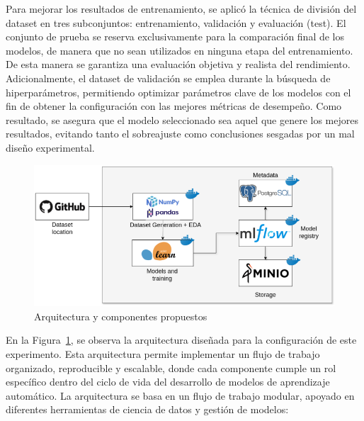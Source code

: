\documentclass[11pt,a4paper,spanish]{book}
\numberwithin{equation}{chapter}
\numberwithin{figure}{chapter}
\begin{document}
Para mejorar los resultados de entrenamiento, se aplicó la técnica de división del dataset en tres subconjuntos: entrenamiento, validación y evaluación (test). El conjunto de prueba se reserva exclusivamente para la comparación final de los modelos, de manera que no sean utilizados en ninguna etapa del entrenamiento. De esta manera se garantiza una evaluación objetiva y realista del rendimiento. 
Adicionalmente, el dataset de validación se emplea durante la búsqueda de hiperparámetros, permitiendo optimizar parámetros clave de los modelos con el fin de obtener la configuración con las mejores métricas de desempeño. Como resultado, se asegura que el modelo seleccionado sea aquel que genere los mejores resultados, evitando tanto el sobreajuste como conclusiones sesgadas por un mal diseño experimental.

\begin{figure}[h]
    \centering
    \includegraphics[width=1\textwidth]{media/arquitecura.png}
    \caption{Arquitectura y componentes propuestos  }
    \label{fig:figArchitecture}
\end{figure}

En la Figura~\ref{fig:figArchitecture}, se observa la arquitectura diseñada para la configuración de este experimento. Esta arquitectura permite implementar un flujo de trabajo organizado, reproducible y escalable, donde cada componente cumple un rol específico dentro del ciclo de vida del desarrollo de modelos de aprendizaje automático. La arquitectura se basa en un flujo de trabajo modular, apoyado en diferentes herramientas de ciencia de datos y gestión de modelos:
\end{document}
